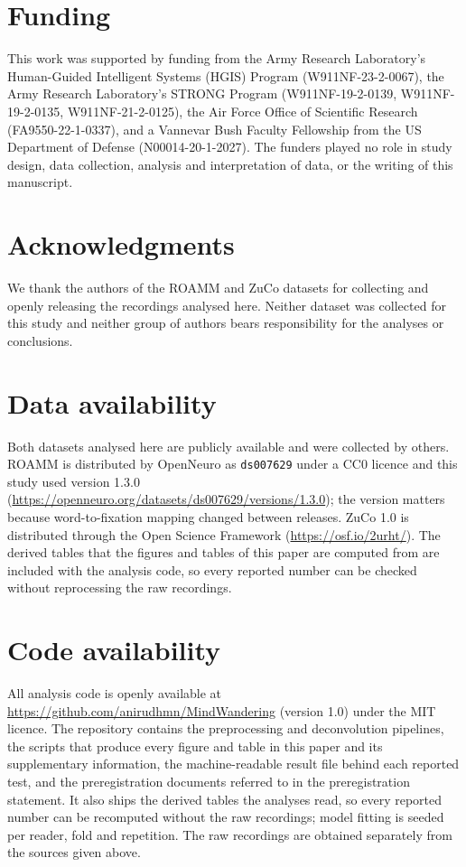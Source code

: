 \documentclass[11pt]{article}
\begin{document}
\section*{Funding}

This work was supported by funding from the Army Research Laboratory's Human-Guided Intelligent
Systems (HGIS) Program (W911NF-23-2-0067), the Army Research Laboratory's STRONG Program
(W911NF-19-2-0139, W911NF-19-2-0135, W911NF-21-2-0125), the Air Force Office of Scientific
Research (FA9550-22-1-0337), and a Vannevar Bush Faculty Fellowship from the US Department of
Defense (N00014-20-1-2027). The funders played no role in study design, data collection,
analysis and interpretation of data, or the writing of this manuscript.

\section*{Acknowledgments}

We thank the authors of the ROAMM and ZuCo datasets for collecting and openly releasing the
recordings analysed here. Neither dataset was collected for this study and neither group of
authors bears responsibility for the analyses or conclusions.

\section*{Data availability}

Both datasets analysed here are publicly available and were collected by others. ROAMM is
distributed by OpenNeuro as \texttt{ds007629} under a CC0 licence and this study used version
1.3.0 (\url{https://openneuro.org/datasets/ds007629/versions/1.3.0}); the version matters
because word-to-fixation mapping changed between releases. ZuCo 1.0 is distributed through the
Open Science Framework (\url{https://osf.io/2urht/}). The derived tables that the figures and
tables of this paper are computed from are included with the analysis code, so every reported
number can be checked without reprocessing the raw recordings.

\section*{Code availability}

All analysis code is openly available at \url{https://github.com/anirudhmn/MindWandering}
(version 1.0) under the MIT licence. The repository contains the preprocessing and
deconvolution pipelines, the scripts that produce every figure and table in this paper and its
supplementary information, the machine-readable result file behind each reported test, and the
preregistration documents referred to in the preregistration statement. It also ships the
derived tables the analyses read, so every reported number can be recomputed without the raw
recordings; model fitting is seeded per reader, fold and repetition. The raw recordings are
obtained separately from the sources given above.
\end{document}
